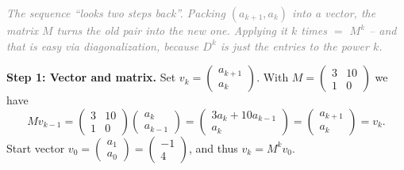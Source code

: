 \documentclass[a4paper,12pt]{article}
\begin{document}
\textcolor{gray}{\small\textit{The sequence ``looks two steps back''. Packing $(a_{k+1}, a_k)$ into a vector, the matrix $M$ turns the old pair into the new one. Applying it $k$ times $=$ $M^k$ -- and that is easy via diagonalization, because $D^k$ is just the entries to the power $k$.}}

\textbf{Step 1: Vector and matrix.} Set $v_k = \begin{pmatrix} a_{k+1} \\ a_k \end{pmatrix}$. With $M = \begin{pmatrix} 3 & 10 \\ 1 & 0 \end{pmatrix}$ we have
\[
M v_{k-1} = \begin{pmatrix} 3 & 10 \\ 1 & 0 \end{pmatrix}\begin{pmatrix} a_k \\ a_{k-1} \end{pmatrix} = \begin{pmatrix} 3a_k + 10 a_{k-1} \\ a_k \end{pmatrix} = \begin{pmatrix} a_{k+1} \\ a_k \end{pmatrix} = v_k.
\]
Start vector $v_0 = \begin{pmatrix} a_1 \\ a_0 \end{pmatrix} = \begin{pmatrix} -1 \\ 4 \end{pmatrix}$, and thus $v_k = M^k v_0$.
\end{document}
